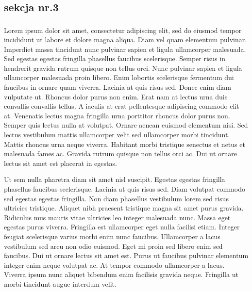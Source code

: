 \documentclass{book}
\begin{document}
\chapter{}
\section{sekcja nr.3}
\lipsum
\lipsum[2-11]
\subsection{}
Lorem ipsum dolor sit amet, consectetur adipiscing elit, sed do eiusmod tempor incididunt ut labore et dolore magna aliqua. Diam vel quam elementum pulvinar. Imperdiet massa tincidunt nunc pulvinar sapien et ligula ullamcorper malesuada. Sed egestas egestas fringilla phasellus faucibus scelerisque. Semper risus in hendrerit gravida rutrum quisque non tellus orci. Nunc pulvinar sapien et ligula ullamcorper malesuada proin libero. Enim lobortis scelerisque fermentum dui faucibus in ornare quam viverra. Lacinia at quis risus sed. Donec enim diam vulputate ut. Rhoncus dolor purus non enim. Erat nam at lectus urna duis convallis convallis tellus. A iaculis at erat pellentesque adipiscing commodo elit at. Venenatis lectus magna fringilla urna porttitor rhoncus dolor purus non. Semper quis lectus nulla at volutpat. Ornare aenean euismod elementum nisi. Sed lectus vestibulum mattis ullamcorper velit sed ullamcorper morbi tincidunt. Mattis rhoncus urna neque viverra. Habitant morbi tristique senectus et netus et malesuada fames ac. Gravida rutrum quisque non tellus orci ac. Dui ut ornare lectus sit amet est placerat in egestas.

Ut sem nulla pharetra diam sit amet nisl suscipit. Egestas egestas fringilla phasellus faucibus scelerisque. Lacinia at quis risus sed. Diam volutpat commodo sed egestas egestas fringilla. Non diam phasellus vestibulum lorem sed risus ultricies tristique. Aliquet nibh praesent tristique magna sit amet purus gravida. Ridiculus mus mauris vitae ultricies leo integer malesuada nunc. Massa eget egestas purus viverra. Fringilla est ullamcorper eget nulla facilisi etiam. Integer feugiat scelerisque varius morbi enim nunc faucibus. Ullamcorper a lacus vestibulum sed arcu non odio euismod. Eget mi proin sed libero enim sed faucibus. Dui ut ornare lectus sit amet est. Purus ut faucibus pulvinar elementum integer enim neque volutpat ac. At tempor commodo ullamcorper a lacus. Viverra ipsum nunc aliquet bibendum enim facilisis gravida neque. Fringilla ut morbi tincidunt augue interdum velit.
\end{document}
